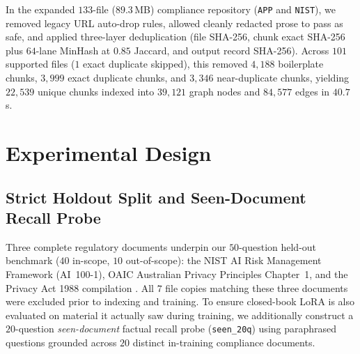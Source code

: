 \documentclass{article}
\begin{document}
In the expanded $133$-file ($89.3$\,MB) compliance repository (\texttt{APP} and \texttt{NIST}), we removed legacy URL auto-drop rules, allowed cleanly redacted prose to pass as safe, and applied three-layer deduplication (file SHA-256, chunk exact SHA-256 plus $64$-lane MinHash at $0.85$ Jaccard, and output record SHA-256). Across $101$ supported files ($1$ exact duplicate skipped), this removed $4{,}188$ boilerplate chunks, $3{,}999$ exact duplicate chunks, and $3{,}346$ near-duplicate chunks, yielding $22{,}539$ unique chunks indexed into $39{,}121$ graph nodes and $84{,}577$ edges in $40.7$\,s.

\section{Experimental Design}
\label{sec:design}

\subsection{Strict Holdout Split and Seen-Document Recall Probe}
Three complete regulatory documents underpin our $50$-question held-out benchmark ($40$ in-scope, $10$ out-of-scope): the NIST AI Risk Management Framework (AI~100-1), OAIC Australian Privacy Principles Chapter~1, and the Privacy Act 1988 compilation \citep{nist_ai_rmf,oaic_app_guidelines,privacy_act_1988}. All $7$ file copies matching these three documents were excluded prior to indexing and training. To ensure closed-book LoRA is also evaluated on material it actually saw during training, we additionally construct a $20$-question \emph{seen-document} factual recall probe (\texttt{seen\_20q}) using paraphrased questions grounded across $20$ distinct in-training compliance documents.
\end{document}
